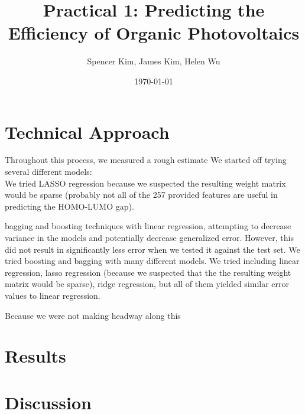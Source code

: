 \documentclass[11pt]{article}
\title{Practical 1: Predicting the Efficiency of Organic Photovoltaics}
\author{Spencer Kim, James Kim, Helen Wu}
\date{\today}
\begin{document}
\maketitle
\section{Technical Approach}
Throughout this process, we measured a rough estimate We started off trying several different models:\\We tried LASSO regression because we suspected the resulting weight matrix would be sparse (probably not all of the 257 provided features are useful in predicting the HOMO-LUMO gap).

bagging and boosting techniques with linear regression, attempting to decrease variance in the models and potentially decrease generalized error. However, this did not result in significantly less error when we tested it against the test set. We tried boosting and bagging with many different models. We tried including linear regression, lasso regression (because we suspected that the the resulting weight matrix would be sparse), ridge regression, but all of them yielded similar error values to linear regression.

Because we were not making headway along this 

\section{Results}


\section{Discussion}
\end{document}
